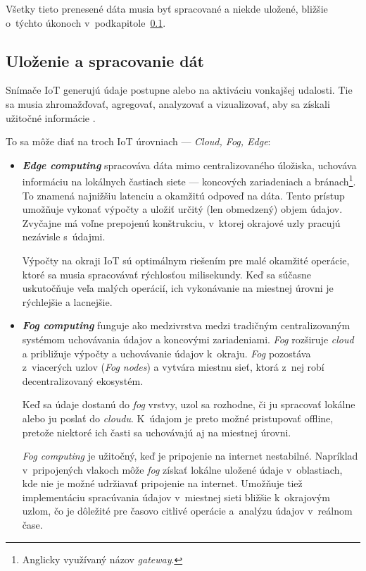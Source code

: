 Všetky tieto prenesené dáta musia byť spracované a niekde uložené, bližšie o~týchto úkonoch v~podkapitole~\ref{iot-data}.


\subsection{Uloženie a spracovanie dát}\label{iot-data}
Snímače IoT generujú údaje postupne alebo na aktiváciu vonkajšej udalosti. 
Tie sa musia zhromažďovať, agregovať, analyzovať a vizualizovať, aby sa získali užitočné informácie \cite{s20216076}.


To sa môže diať na troch IoT úrovniach — \emph{Cloud, Fog, Edge}:
\begin{itemize}
    \item \textit{\textbf{Edge computing}} spracováva dáta mimo centralizovaného úložiska, uchováva informáciu na lokálnych častiach siete — koncových zariadeniach a bránach\footnote{Anglicky využívaný názov \emph{gateway}.}. 
    To znamená najnižšiu latenciu a okamžitú odpoveď na dáta. 
    Tento prístup umožňuje vykonať výpočty a uložiť určitý (len obmedzený) objem údajov. 
    Zvyčajne má voľne prepojenú konštrukciu, v~ktorej okrajové uzly pracujú nezávisle s~údajmi.~\cite{teamDigetum_2022}
    
    Výpočty na okraji IoT sú optimálnym riešením pre malé okamžité operácie, ktoré sa musia spracovávať rýchlosťou milisekundy. 
    Keď sa súčasne uskutočňuje veľa malých operácií, ich vykonávanie na miestnej úrovni je rýchlejšie a lacnejšie.~\cite{teamDigetum_2022}
    
    \item \textit{\textbf{Fog computing}} funguje ako medzivrstva medzi tradičným centralizovaným systémom uchovávania údajov a koncovými zariadeniami. 
    \emph{Fog} rozširuje \emph{cloud} a približuje výpočty a uchovávanie údajov k~okraju. 
    \emph{Fog} pozostáva z~viacerých uzlov (\emph{Fog nodes}) a vytvára miestnu sieť, ktorá z~nej robí decentralizovaný ekosystém. ~\cite{teamDigetum_2022}
    
    Keď sa údaje dostanú do \emph{fog} vrstvy, uzol sa rozhodne, či ju spracovať lokálne alebo ju poslať do \emph{cloudu}. 
    K~údajom je preto možné pristupovať offline, pretože niektoré ich časti sa uchovávajú aj na miestnej úrovni.~\cite{teamDigetum_2022}
    
    \emph{Fog computing} je užitočný, keď je pripojenie na internet nestabilné. 
    Napríklad v~pripojených vlakoch môže \emph{fog} získať lokálne uložené údaje v~oblastiach, kde nie je možné udržiavať pripojenie na internet. 
    Umožňuje tiež implementáciu spracúvania údajov v~miestnej sieti bližšie k~okrajovým uzlom, čo je dôležité pre časovo citlivé operácie a~analýzu údajov v~reálnom čase.~\cite{teamDigetum_2022}


\end{itemize}
